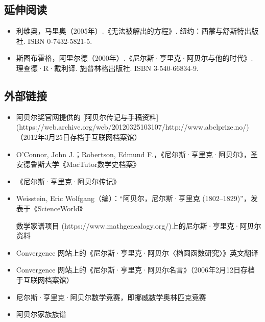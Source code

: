 \subsection{延伸阅读}
\begin{itemize}
\item 利维奥，马里奥（2005年）.《无法被解出的方程》. 纽约：西蒙与舒斯特出版社. ISBN 0-7432-5821-5.
\item 斯图布霍格，阿里尔德（2000年）.《尼尔斯·亨里克·阿贝尔与他的时代》. 理查德·R·戴利译. 施普林格出版社. ISBN 3-540-66834-9.
\end{itemize}
\subsection{外部链接}
\begin{itemize}
\item 阿贝尔奖官网提供的 [阿贝尔传记与手稿资料](https://web.archive.org/web/20120325103107/http://www.abelprize.no/)（2012年3月25日存档于互联网档案馆）
\item O'Connor, John J.；Robertson, Edmund F.，《尼尔斯·亨里克·阿贝尔》，圣安德鲁斯大学《MacTutor数学史档案》
\item 《尼尔斯·亨里克·阿贝尔传记》
\item Weisstein, Eric Wolfgang（编）：“阿贝尔，尼尔斯·亨里克 (1802–1829)”，发表于《ScienceWorld》
\item [数学家谱项目](https://www.mathgenealogy.org/)上的尼尔斯·亨里克·阿贝尔资料
\item Convergence 网站上的《尼尔斯·亨里克·阿贝尔〈椭圆函数研究〉》英文翻译
\item Convergence 网站上的《尼尔斯·亨里克·阿贝尔名言》（2006年2月12日存档于互联网档案馆）
\item 尼尔斯·亨里克·阿贝尔数学竞赛，即挪威数学奥林匹克竞赛
\item 阿贝尔家族族谱
\end{itemize}